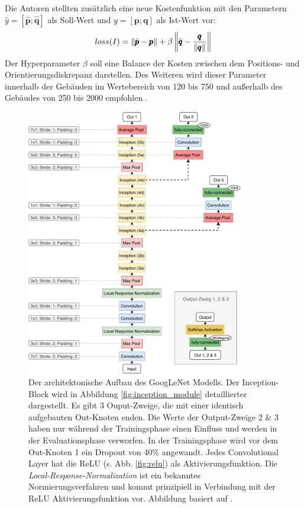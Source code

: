 Die Autoren \citet{kendallPoseNetConvolutionalNetwork2015} stellten zusätzlich eine neue Kostenfunktion mit den Parametern $\hat{y} = [\hat{\pmb{p}};\hat{\pmb{q}}]$ als Soll-Wert und $y = [\pmb{p};\pmb{q}]$ als Ist-Wert vor:
\begin{equation}
	\label{eq:posenet_loss}
	loss(I) = \left\lVert \hat{\pmb{p}} - \pmb{p} \right\rVert + \beta \left\lVert \hat{\pmb{q}} - \frac{\pmb{q}}{\left\lVert\pmb{q}\right\rVert}\right\rVert
\end{equation}
Der Hyperparameter $\beta$ soll eine Balance der Kosten zwischen dem Positions- und Orientierungsdiskrepanz darstellen. Des Weiteren wird dieser Parameter innerhalb der Gebäuden im Wertebereich von 120 bis 750 und außerhalb des Gebäudes von 250 bis 2000 empfohlen \cite{kendallPoseNetConvolutionalNetwork2015}. 

\begin{figure}[bp]
	\centering
	\includegraphics[width=0.85\textwidth]{images/googlenet/googlenet_diagram.pdf}
	\caption{Der architektonische Aufbau des GoogLeNet Modells. Der Inception-Block wird in Abbildung \ref{fig:inception_module} detaillierter dargestellt. Es gibt 3 Ouput-Zweige, die mit einer identisch aufgebauten Out-Knoten enden. Die Werte der Output-Zweige 2 \& 3 haben nur während der Trainingsphase einen Einfluss und werden in der Evaluationsphase verworfen. In der Trainingsphase wird vor dem Out-Knoten 1 ein Dropout von 40\% angewandt. Jedes Convolutional Layer hat die ReLU (s. Abb. \ref{fig:relu}) als Aktivierungsfunktion. Die \textit{Local-Response-Normalization} \cite{krizhevskyImageNetClassificationDeep2012} ist ein bekanntes Normierungsverfahren und kommt prinzipiell in Verbindung mit der ReLU Aktivierungsfunktion vor. Abbildung basiert auf \cite{szegedyGoingDeeperConvolutions2015}.}
	\label{fig:googlenet}
\end{figure}

